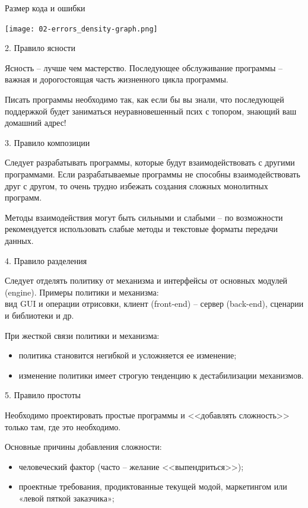 \begin{frame}{Размер кода и ошибки}
	\begin{center}
		\texttt{[image: 02-errors\_density-graph.png]}
	\end{center}
\end{frame}

\begin{frame}{2. Правило ясности}
	\begin{block}{Ясность -- лучше чем мастерство.}
		\pause
		Последующее обслуживание программы -- важная и дорогостоящая часть жизненного цикла программы.
	\end{block}
	\pause
Писать программы необходимо так,  как если бы вы знали,  что последующей поддержкой будет заниматься неуравновешенный псих с топором,  знающий ваш домашний адрес!
\end{frame}

\begin{frame}{3. Правило композиции}
	\begin{block}{Следует разрабатывать программы,  которые будут взаимодействовать с другими программами.}
		\pause
		Если разрабатываемые программы не способны взаимодействовать друг с другом,  то очень трудно избежать создания сложных монолитных  программ.
	\end{block}
	\pause
	Методы взаимодействия могут быть сильными и слабыми -- по возможности рекомендуется использовать слабые методы и текстовые форматы передачи данных.
\end{frame}

\begin{frame}{4. Правило разделения}
	\begin{block}{Следует отделять политику от механизма и интерфейсы от основных модулей (engine).}
		Примеры политики и механизма:\\
		вид GUI и операции отрисовки, клиент (front-end) -- сервер (back-end), сценарии и библиотеки и др.
	\end{block}
	\pause
	При жесткой связи политики и механизма:
	\begin{itemize}
		\item политика становится негибкой и усложняется ее изменение;
		\item изменение политики имеет строгую тенденцию к дестабилизации механизмов.
	\end{itemize}
\end{frame}

\begin{frame}{5. Правило простоты}
	\begin{block}{Необходимо проектировать простые программы и <<добавлять сложность>> только там,  где это необходимо.}
	\end{block}
	\pause
	Основные причины добавления сложности:
	\begin{itemize}
		\item человеческий фактор (часто -- желание <<выпендриться>>);
		\item проектные требования,  продиктованные текущей модой,  маркетингом или «левой пяткой заказчика»;
	\end{itemize}
\end{frame}

